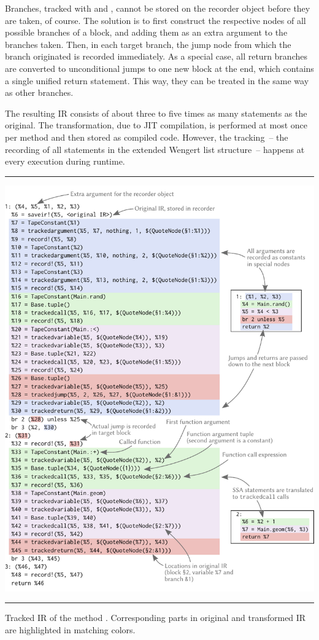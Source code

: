 Branches, tracked with  and , cannot be stored on the
recorder object before they are taken, of course.  The solution is to first construct the respective
nodes of all possible branches of a block, and adding them as an extra argument to the branches
taken.  Then, in each target branch, the jump node from which the branch originated is recorded
immediately.  As a special case, all return branches are converted to unconditional jumps to one new
block at the end, which contains a single unified return statement.  This way, they can be treated
in the same way as other branches.

The resulting IR consists of about three to five times as many statements as the original.  The
transformation, due to JIT compilation, is performed at most once per method and then stored as
compiled code.  However, the tracking~-- the recording of all statements in the extended Wengert
list structure~-- happens at every execution during runtime.

\begin{lstfloat}[p]
  \hrule
  \includegraphics[width=\textwidth]{figures/translation}
  \hrule
  \caption{Tracked IR of the method \protect{}.  Corresponding parts in
    original and transformed IR are highlighted in matching colors.}
  \label{lst:geom-tracked}
\end{lstfloat}

